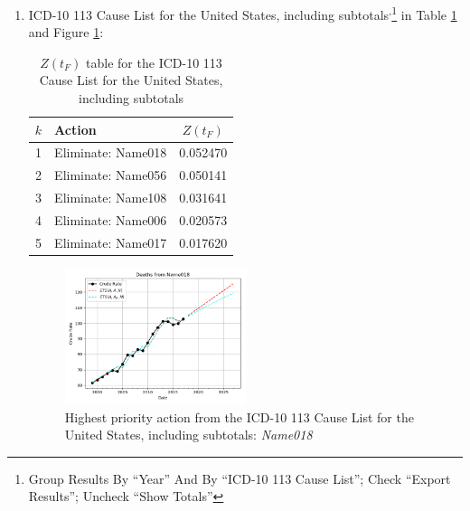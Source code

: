 \documentclass[12pt, a4paper, twocolumn]{article}
\begin{document}
\begin{enumerate}
  \item ICD-10 113 Cause List for the United States, including subtotals\cite{centers2017underlying}\textsuperscript{,}\footnote{Group Results By \enquote{Year} And By \enquote{ICD-10 113 Cause List}; Check \enquote{Export Results}; Uncheck \enquote{Show Totals}} in Table \ref{table:ztable2} and Figure \ref{fig:k2}:
    \begin{table}[H]
      \centering
      \begin{tabular}{clc}
        \toprule
          $k$ & Action             & $Z(t_F)$ \\
        \midrule
          1   & Eliminate: Name018 & 0.052470 \\
          2   & Eliminate: Name056 & 0.050141 \\
          3   & Eliminate: Name108 & 0.031641 \\
          4   & Eliminate: Name006 & 0.020573 \\
          5   & Eliminate: Name017 & 0.017620 \\
        \bottomrule
      \end{tabular}
      \caption{$Z(t_F)$ table for the ICD-10 113 Cause List for the United States, including subtotals}
      \label{table:ztable2}
    \end{table}
    \begin{figure}[H]
      \centering
      \includegraphics[width=0.5\textwidth]{results/US_ICD10_113_SELECTED_CAUSES_ALL/Name018_ets.png}
      \caption{Highest priority action from the ICD-10 113 Cause List for the United States, including subtotals: \textit{Name018}}\label{fig:k2}
    \end{figure}


\end{enumerate}
\end{document}
